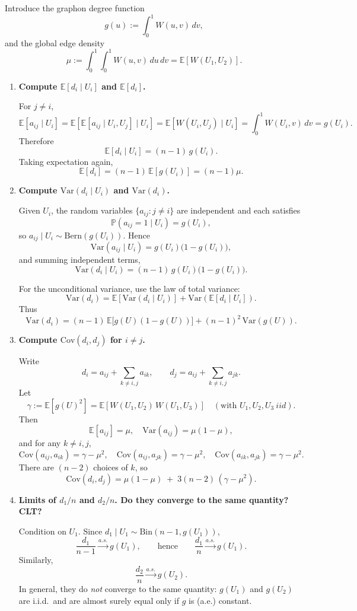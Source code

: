 \documentclass[11pt]{article}
\newcommand{\E}{\mathbb{E}}
\newcommand{\Var}{\mathrm{Var}}
\newcommand{\Cov}{\mathrm{Cov}}
\newcommand{\Bern}{\mathrm{Bern}}
\begin{document}
Introduce the graphon degree function
\[
g(u):=\int_0^1 W(u,v)\,dv,
\]
and the global edge density
\[
\mu := \int_0^1\int_0^1 W(u,v)\,du\,dv = \E[W(U_1,U_2)].
\]

\begin{enumerate}[label=(\alph*)]
\item \textbf{Compute $\E[d_i\mid U_i]$ and $\E[d_i]$.}

For $j\ne i$,
\[
\E[a_{ij}\mid U_i]
=\E\!\left[\E[a_{ij}\mid U_i,U_j]\mid U_i\right]
=\E[W(U_i,U_j)\mid U_i]
=\int_0^1 W(U_i,v)\,dv
=g(U_i).
\]
Therefore
\[
\E[d_i\mid U_i]=(n-1)\,g(U_i).
\]
Taking expectation again,
\[
\E[d_i]=(n-1)\,\E[g(U_i)]=(n-1)\mu.
\]

\item \textbf{Compute $\Var(d_i\mid U_i)$ and $\Var(d_i)$.}

Given $U_i$, the random variables $\{a_{ij}:j\ne i\}$ are independent and each satisfies
\[
\mathbb P(a_{ij}=1\mid U_i)=g(U_i),
\]
so $a_{ij}\mid U_i \sim \Bern(g(U_i))$. Hence
\[
\Var(a_{ij}\mid U_i)=g(U_i)\bigl(1-g(U_i)\bigr),
\]
and summing independent terms,
\[
\Var(d_i\mid U_i)=(n-1)\,g(U_i)\bigl(1-g(U_i)\bigr).
\]

For the unconditional variance, use the law of total variance:
\[
\Var(d_i)=\E[\Var(d_i\mid U_i)] + \Var(\E[d_i\mid U_i]).
\]
Thus
\[
\Var(d_i)
=(n-1)\,\E\!\big[g(U)(1-g(U))\big] + (n-1)^2\,\Var(g(U)).
\]

\item \textbf{Compute $\Cov(d_i,d_j)$ for $i\ne j$.}

Write
\[
d_i = a_{ij} + \sum_{k\ne i,j} a_{ik},
\qquad
d_j = a_{ij} + \sum_{k\ne i,j} a_{jk}.
\]
Let
\[
\gamma := \E\!\left[g(U)^2\right]
= \E\!\left[W(U_1,U_2)\,W(U_1,U_3)\right]
\quad (\text{with }U_1,U_2,U_3\ iid).
\]
Then
\[
\E[a_{ij}]=\mu,\quad \Var(a_{ij})=\mu(1-\mu),
\]
and for any $k\ne i,j$,
\[
\Cov(a_{ij},a_{ik})=\gamma-\mu^2,\quad
\Cov(a_{ij},a_{jk})=\gamma-\mu^2,\quad
\Cov(a_{ik},a_{jk})=\gamma-\mu^2.
\]
There are $(n-2)$ choices of $k$, so
\[
\Cov(d_i,d_j)=\mu(1-\mu)\;+\;3(n-2)\,(\gamma-\mu^2).
\]

\item \textbf{Limits of $d_1/n$ and $d_2/n$. Do they converge to the same quantity? CLT?}

Condition on $U_1$. Since $d_1\mid U_1 \sim \mathrm{Bin}(n-1,g(U_1))$,
\[
\frac{d_1}{n-1}\xrightarrow{a.s.} g(U_1),
\qquad\text{hence}\qquad
\frac{d_1}{n}\xrightarrow{a.s.} g(U_1).
\]
Similarly,
\[
\frac{d_2}{n}\xrightarrow{a.s.} g(U_2).
\]
In general, they do \emph{not} converge to the same quantity: $g(U_1)$ and $g(U_2)$ are i.i.d.\ and are almost surely equal only if $g$ is (a.e.) constant.


\end{enumerate}
\end{document}
